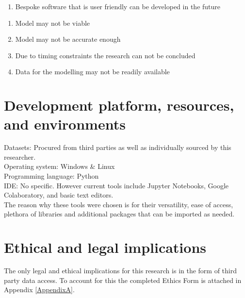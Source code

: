 \begin{tcbraster}[raster columns=2, boxrule=0mm, arc=0mm]
\begin{tcolorbox}[equal height group=B, size=fbox, colback=swotO!60, colframe=swotO!80!black, title=\textsc{opportunities}]
\begin{enumerate}
\item Bespoke software that is user friendly can be developed in the future
\end{enumerate}
\end{tcolorbox}
\begin{tcolorbox}[equal height group=B, size=fbox, colback=swotT!60, colframe=swotT!80!black, title=\textsc{threats}]
\begin{enumerate}
\item Model may not be viable
\item Model may not be accurate enough
\item Due to timing constraints the research can not be concluded
\item Data for the modelling may not be readily available
\end{enumerate}
\end{tcolorbox}
\end{tcbraster}
\section{Development platform, resources, and environments}
Datasets: Procured from third parties as well as individually sourced by this researcher.\\
Operating system: Windows \& Linux\\
Programming language: Python\\
IDE: No specific. However current tools include Jupyter Notebooks, Google Colaboratory, and basic text editors.\\
The reason why these tools were chosen is for their versatility, ease of access, plethora of libraries and additional packages that can be imported as needed. 
\section{Ethical and legal implications}
The only legal and ethical implications for this research is in the form of third party data access. To account for this the completed Ethics Form is attached in Appendix \ref{AppendixA}.
